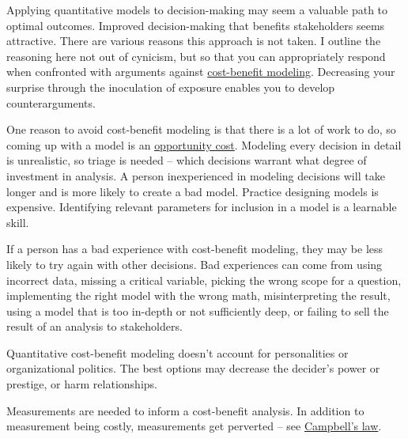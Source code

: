 Applying quantitative models to decision-making may seem a valuable path to optimal outcomes. Improved decision-making that benefits stakeholders seems attractive. There are various reasons this approach is not taken. I outline the reasoning here not out of cynicism, but so that you can appropriately respond when confronted with arguments against \href{https://en.wikipedia.org/wiki/Cost\%E2\%80\%93benefit_analysis}{cost-benefit modeling}.
Decreasing your surprise through the inoculation of exposure enables you to develop counterarguments. 

One reason to avoid cost-benefit modeling is that there is a lot of work to do, so coming up with a model is an \href{https://en.wikipedia.org/wiki/Opportunity_cost}{opportunity cost}. 
Modeling every decision in detail is unrealistic, so triage is needed -- which decisions warrant what degree of investment in analysis. A person inexperienced in modeling decisions will take longer and is more likely to create a bad model. Practice designing models is expensive. Identifying relevant parameters for inclusion in a model is a learnable skill. 

If a person has a bad experience with cost-benefit modeling, they may be less likely to try again with other decisions. Bad experiences can come from using incorrect data, missing a critical variable, picking the wrong scope for a question, implementing the right model with the wrong math, misinterpreting the result, using a model that is too in-depth or not sufficiently deep, or failing to sell the result of an analysis to stakeholders.

Quantitative cost-benefit modeling doesn't account for personalities or organizational politics. The best options may decrease the decider's power or prestige, or harm relationships. 

Measurements are needed to inform a cost-benefit analysis. In addition to measurement being costly, measurements get perverted -- see \href{https://en.wikipedia.org/wiki/Campbell\%27s_law}{Campbell's law}. 

